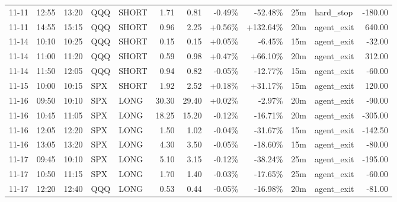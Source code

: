 \documentclass[11pt,a4paper]{article}
\begin{document}
\begin{center}
\begin{longtable}{>{\color{txtmain}}l l l l l r r r r r >{\color{txtmain}}l r}
11-11 & 12:55 & 13:20 & QQQ & SHORT & 1.71 & 0.81 & \textcolor{lossred}{-0.49\%} & \textcolor{lossred}{-52.48\%} & 25m & hard\_stop & \textcolor{lossred}{-180.00} \\
11-11 & 14:55 & 15:15 & QQQ & SHORT & 0.96 & 2.25 & \textcolor{wingreen}{+0.56\%} & \textcolor{wingreen}{+132.64\%} & 20m & agent\_exit & \textcolor{wingreen}{640.00} \\
11-14 & 10:10 & 10:25 & QQQ & SHORT & 0.15 & 0.15 & \textcolor{wingreen}{+0.05\%} & \textcolor{lossred}{-6.45\%} & 15m & agent\_exit & \textcolor{lossred}{-32.00} \\
11-14 & 11:00 & 11:20 & QQQ & SHORT & 0.59 & 0.98 & \textcolor{wingreen}{+0.47\%} & \textcolor{wingreen}{+66.10\%} & 20m & agent\_exit & \textcolor{wingreen}{312.00} \\
11-14 & 11:50 & 12:05 & QQQ & SHORT & 0.94 & 0.82 & \textcolor{lossred}{-0.05\%} & \textcolor{lossred}{-12.77\%} & 15m & agent\_exit & \textcolor{lossred}{-60.00} \\
11-15 & 10:00 & 10:15 & SPX & SHORT & 1.92 & 2.52 & \textcolor{wingreen}{+0.18\%} & \textcolor{wingreen}{+31.17\%} & 15m & agent\_exit & \textcolor{wingreen}{120.00} \\
11-16 & 09:50 & 10:10 & SPX & LONG & 30.30 & 29.40 & \textcolor{wingreen}{+0.02\%} & \textcolor{lossred}{-2.97\%} & 20m & agent\_exit & \textcolor{lossred}{-90.00} \\
11-16 & 10:45 & 11:05 & SPX & LONG & 18.25 & 15.20 & \textcolor{lossred}{-0.12\%} & \textcolor{lossred}{-16.71\%} & 20m & agent\_exit & \textcolor{lossred}{-305.00} \\
11-16 & 12:05 & 12:20 & SPX & LONG & 1.50 & 1.02 & \textcolor{lossred}{-0.04\%} & \textcolor{lossred}{-31.67\%} & 15m & agent\_exit & \textcolor{lossred}{-142.50} \\
11-16 & 13:05 & 13:20 & SPX & LONG & 4.30 & 3.50 & \textcolor{lossred}{-0.05\%} & \textcolor{lossred}{-18.60\%} & 15m & agent\_exit & \textcolor{lossred}{-80.00} \\
11-17 & 09:45 & 10:10 & SPX & LONG & 5.10 & 3.15 & \textcolor{lossred}{-0.12\%} & \textcolor{lossred}{-38.24\%} & 25m & agent\_exit & \textcolor{lossred}{-195.00} \\
11-17 & 10:50 & 11:15 & SPX & LONG & 1.70 & 1.40 & \textcolor{lossred}{-0.03\%} & \textcolor{lossred}{-17.65\%} & 25m & agent\_exit & \textcolor{lossred}{-60.00} \\
11-17 & 12:20 & 12:40 & QQQ & LONG & 0.53 & 0.44 & \textcolor{lossred}{-0.05\%} & \textcolor{lossred}{-16.98\%} & 20m & agent\_exit & \textcolor{lossred}{-81.00} \\

\end{longtable}
\end{center}
\end{document}
